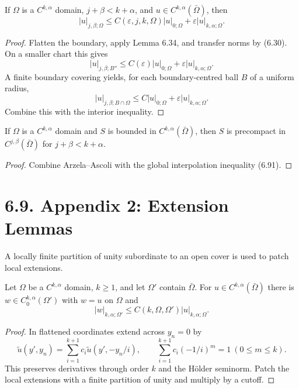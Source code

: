 \begin{lemma}
\label{gt-ch06-lem-6-35}
If $\Omega$ is a $C^{k,\alpha}$ domain, $j+\beta<k+\alpha$, and
$u\in C^{k,\alpha}(\bar\Omega)$, then
\begin{equation}\tag{6.91}
|u|_{j,\beta;\Omega}\le C(\varepsilon,j,k,\Omega)|u|_{0;\Omega}
+\varepsilon|u|_{k,\alpha;\Omega}.
\end{equation}
\end{lemma}
\begin{proof}
\sketch Flatten the boundary, apply Lemma 6.34, and transfer norms by (6.30).
On a smaller chart this gives
\begin{equation}
\tag{6.92}
|u|_{j,\beta;B''}
\leq C(\varepsilon)|u|_{0;\Omega}
+\varepsilon|u|_{k,\alpha;\Omega}.
\end{equation}
A finite boundary covering yields, for each boundary-centred ball $B$ of a
uniform radius,
\begin{equation}
\tag{6.93}
|u|_{j,\beta;B\cap\Omega}
\leq C|u|_{0;\Omega}+\varepsilon|u|_{k,\alpha;\Omega}.
\end{equation}
Combine this with the interior inequality.
\end{proof}

\begin{lemma}
\label{gt-ch06-lem-6-36}
If $\Omega$ is a $C^{k,\alpha}$ domain and $S$ is bounded in
$C^{k,\alpha}(\bar\Omega)$, then $S$ is precompact in
$C^{j,\beta}(\bar\Omega)$ for $j+\beta<k+\alpha$.
\end{lemma}
\begin{proof}
\sketch Combine Arzela--Ascoli with the global interpolation inequality (6.91).
\end{proof}

\section*{6.9. Appendix 2: Extension Lemmas}

A locally finite partition of unity subordinate to an open cover is used to
patch local extensions.

\begin{lemma}
\label{gt-ch06-lem-6-37}
Let $\Omega$ be a $C^{k,\alpha}$ domain, $k\ge1$, and let $\Omega'$ contain
$\bar\Omega$.  For $u\in C^{k,\alpha}(\bar\Omega)$ there is
$w\in C_0^{k,\alpha}(\Omega')$ with $w=u$ on $\Omega$ and
\begin{equation}\tag{6.94}
|w|_{k,\alpha;\Omega'}\le C(k,\Omega,\Omega')|u|_{k,\alpha;\Omega}.
\end{equation}
\end{lemma}
\begin{proof}
\sketch In flattened coordinates extend across $y_n=0$ by
\[
\widetilde u(y',y_n)=\sum_{i=1}^{k+1}c_i\widetilde u(y',-y_n/i),\qquad
\sum_{i=1}^{k+1}c_i(-1/i)^m=1\ (0\le m\le k).
\]
This preserves derivatives through order $k$ and the H\"older seminorm.  Patch
the local extensions with a finite partition of unity and multiply by a cutoff.
\end{proof}

